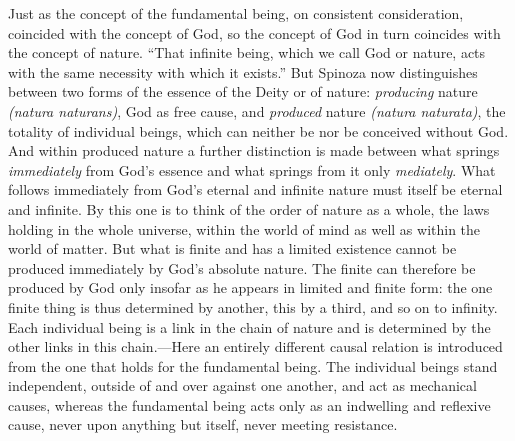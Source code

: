 \documentclass[12pt]{book}
\newcommand{\opage}[1]{\marginnote{\footnotesize\textit{[#1]}}}
\begin{document}
Just as the concept of the fundamental being, on consistent consideration, coincided
with the concept of God, so the concept of God in turn coincides with the concept of
nature. ``That infinite being, which we call God or nature, acts with the same necessity
with which it exists.'' But Spinoza now distinguishes between two forms of the essence
of the Deity or of nature: \emph{producing} nature \textit{(natura naturans)}, God as
free cause, and \emph{produced} nature \textit{(natura naturata)}, the totality of
individual beings, which can neither be nor be conceived without God. And within
produced nature a further distinction is made between what springs \emph{immediately}
from God's essence and what springs from it only \emph{mediately}. What follows
immediately from God's eternal and infinite nature must itself be eternal and infinite.
By this one is to think of the order of nature as a whole, the laws holding in the whole
universe, within the world of mind as well as within the world of matter. But what is
finite and has a limited existence cannot be produced immediately by God's absolute
nature. The finite can therefore be produced by God only insofar as he appears in
limited and finite form: the one finite thing is thus determined by another, this by a
third, and so on to infinity. Each individual being is a link \opage{85}in the chain of
nature and is determined by the other links in this chain.---Here an entirely different
causal relation is introduced from the one that holds for the fundamental being. The
individual beings stand independent, outside of and over against one another, and act as
mechanical causes, whereas the fundamental being acts only as an indwelling and
reflexive cause, never upon anything but itself, never meeting resistance.
\end{document}
